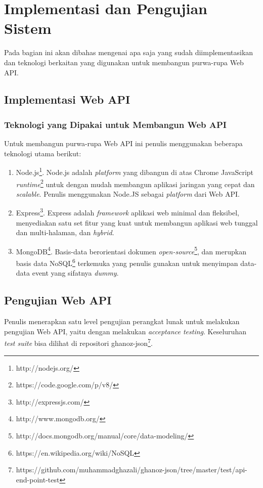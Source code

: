 \documentclass[a4paper, 12pt, oneside]{report}
\begin{document}
\chapter{Implementasi dan Pengujian Sistem}

\onehalfspacing Pada bagian ini akan dibahas mengenai apa saja yang sudah diimplementasikan dan teknologi berkaitan yang digunakan untuk membangun purwa-rupa Web API.

\section{Implementasi Web API}

\subsection{Teknologi yang Dipakai untuk Membangun Web API}

\onehalfspacing Untuk membangun purwa-rupa Web API ini penulis menggunakan beberapa teknologi utama berikut:

\begin{enumerate}
  \item Node.js\footnote{http://nodejs.org/}. Node.js adalah \textit{platform} yang dibangun di atas Chrome JavaScript \textit{runtime}\footnote{https://code.google.com/p/v8/} untuk dengan mudah membangun aplikasi jaringan yang cepat dan \textit{scalable}. Penulis menggunakan Node.JS sebagai \textit{platform} dari Web API.
  \item Express\footnote{http://expressjs.com/}. Express adalah \textit{framework} aplikasi web minimal dan fleksibel, menyediakan satu set fitur yang kuat untuk membangun aplikasi web tunggal dan multi-halaman, dan \textit{hybrid}.
  \item MongoDB\footnote{http://www.mongodb.org/}. Basis-data berorientasi dokumen \textit{open-source}\footnote{http://docs.mongodb.org/manual/core/data-modeling/}, dan merupkan basis data NoSQL\footnote{https://en.wikipedia.org/wiki/NoSQL} terkemuka yang penulis gunakan untuk menyimpan data-data event yang sifatnya \textit{dummy}.
\end{enumerate}

\section{Pengujian Web API}

Penulis menerapkan satu level pengujian perangkat lunak untuk melakukan pengujian Web API, yaitu dengan melakukan \textit{acceptance testing}. Keseluruhan \textit{test suite} bisa dilihat di repositori ghanoz-json\footnote{https://github.com/muhammadghazali/ghanoz-json/tree/master/test/api-end-point-test}.
\end{document}
